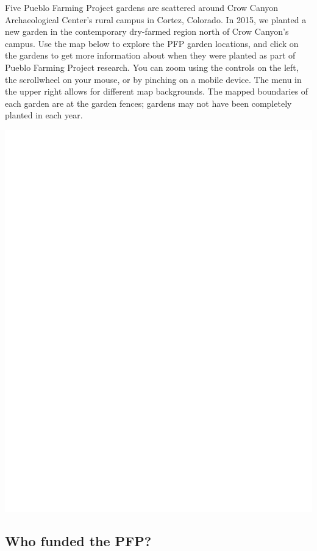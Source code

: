\documentclass[12pt,]{article}
\begin{document}
Five Pueblo Farming Project gardens are scattered around Crow Canyon Archaeological Center's rural campus in Cortez, Colorado. In 2015, we planted a new garden in the contemporary dry-farmed region north of Crow Canyon's campus. Use the map below to explore the PFP garden locations, and click on the gardens to get more information about when they were planted as part of Pueblo Farming Project research. You can zoom using the controls on the left, the scrollwheel on your mouse, or by pinching on a mobile device. The menu in the upper right allows for different map backgrounds. The mapped boundaries of each garden are at the garden fences; gardens may not have been completely planted in each year.

\includegraphics{images/unnamed-chunk-1-1.pdf}

\hypertarget{who-funded-the-pfp}{%
\subsection{Who funded the PFP?}\label{who-funded-the-pfp}}
\end{document}
